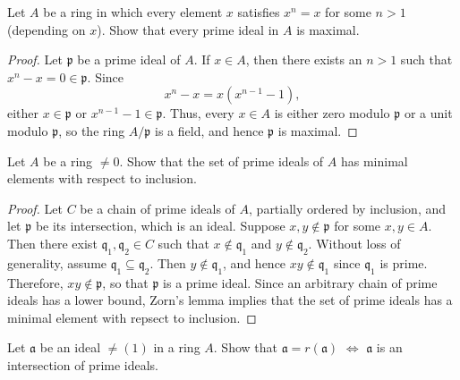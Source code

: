\begin{exercise}
\label{ex:1.7}
Let $A$ be a ring in which every element $x$ satisfies $x^n = x$ for some $n > 1$ (depending on $x$).
Show that every prime ideal in $A$ is maximal.
\end{exercise}

\begin{proof}
Let $\mathfrak p$ be a prime ideal of $A$.
If $x \in A$, then there exists an $n > 1$ such that $x^n - x = 0 \in \mathfrak p$.
Since
\begin{equation*}
x^n - x = x(x^{n-1} - 1),
\end{equation*}
either $x\in\mathfrak p$ or $x^{n-1} - 1 \in \mathfrak p$.
Thus, every $x \in A$ is either zero modulo $\mathfrak p$ or a unit modulo $\mathfrak p$, so the ring $A/\mathfrak p$ is a field, and hence $\mathfrak p$ is maximal.
\end{proof}








\begin{exercise}
\label{ex:1.8}
Let $A$ be a ring $\neq 0$.
Show that the set of prime ideals of $A$ has minimal elements with respect to inclusion.
\end{exercise}

\begin{proof}
Let $C$ be a chain of prime ideals of $A$, partially ordered by inclusion, and let $\mathfrak p$ be its intersection, which is an ideal.
Suppose $x, y \notin \mathfrak p$ for some $x,y\in A$.
Then there exist $\mathfrak q_1,\mathfrak q_2 \in C$ such that $x \notin \mathfrak q_1$ and $y \notin \mathfrak q_2$.
Without loss of generality, assume $\mathfrak q_1 \subseteq \mathfrak q_2$.
Then $y \notin \mathfrak q_1$, and hence $x y \notin \mathfrak q_1$ since $\mathfrak q_1$ is prime.
Therefore, $x y \notin \mathfrak p$, so that $\mathfrak p$ is a prime ideal.
Since an arbitrary chain of prime ideals has a lower bound, Zorn's lemma implies that the set of prime ideals has a minimal element with repsect to inclusion.
\end{proof}







\begin{exercise}
\label{ex:1.9}
Let $\mathfrak a$ be an ideal $\neq (1)$ in a ring $A$.
Show that $\mathfrak a = r(\mathfrak a)$ $\iff$ $\mathfrak a$ is an intersection of prime ideals.
\end{exercise}

